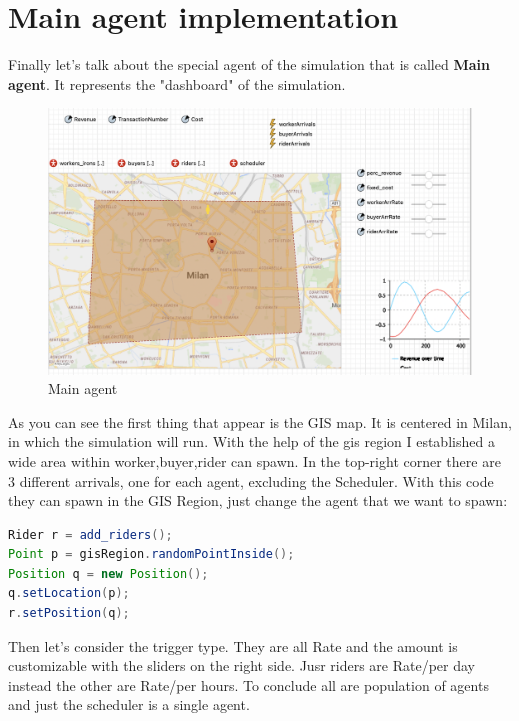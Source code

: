 \section{Main agent implementation}
Finally let's talk about the special agent of the simulation that is called \textbf{Main agent}. It represents the "dashboard" of the simulation. 
\begin{figure}[hbtp]
\caption{Main agent }
\centering
\includegraphics[scale=0.5]{../Images/main.png}
\end{figure}
As you can see the first thing that appear is the GIS map. It is centered in Milan, in which the simulation will run. With the help of the gis region I established a wide area within worker,buyer,rider can spawn. In the top-right corner there are 3 different arrivals, one for each agent, excluding the Scheduler.
With this code they can spawn in the GIS Region, just change the agent that we want to spawn:
\begin{lstlisting}[language=Java]
Rider r = add_riders();
Point p = gisRegion.randomPointInside();
Position q = new Position();
q.setLocation(p);
r.setPosition(q);
\end{lstlisting} 
Then let's consider the trigger type. They are all Rate and the amount is customizable with the sliders on the right side. Jusr riders are Rate/per day instead the other are Rate/per hours.
To conclude all are population of agents and just the scheduler is a single agent.
